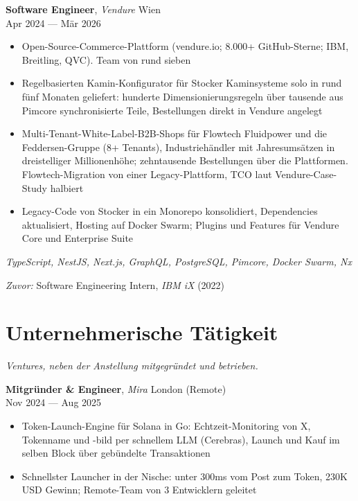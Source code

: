 \documentclass[a4paper,10pt]{article}
\newcommand{\entry}[4]{%
  \textbf{#1}, \textit{#2} \hfill #3 \\ \vspace{-2pt}
  {\small #4}%
}
\begin{document}
\vspace{3pt}
\entry{Software Engineer}{Vendure}{Wien}{Apr 2024 --- M\"ar 2026}
\begin{itemize}
  \item Open-Source-Commerce-Plattform (vendure.io; 8.000+ GitHub-Sterne; IBM, Breitling, QVC). Team von rund sieben
  \item Regelbasierten Kamin-Konfigurator f\"ur Stocker Kaminsysteme solo in rund f\"unf Monaten geliefert: hunderte Dimensionierungsregeln \"uber tausende aus Pimcore synchronisierte Teile, Bestellungen direkt in Vendure angelegt
  \item Multi-Tenant-White-Label-B2B-Shops f\"ur Flowtech Fluidpower und die Feddersen-Gruppe (8+ Tenants), Industrieh\"andler mit Jahresums\"atzen in dreistelliger Millionenh\"ohe; zehntausende Bestellungen \"uber die Plattformen. Flowtech-Migration von einer Legacy-Plattform, TCO laut Vendure-Case-Study halbiert
  \item Legacy-Code von Stocker in ein Monorepo konsolidiert, Dependencies aktualisiert, Hosting auf Docker Swarm; Plugins und Features f\"ur Vendure Core und Enterprise Suite
\end{itemize}
{\small\textit{TypeScript, NestJS, Next.js, GraphQL, PostgreSQL, Pimcore, Docker Swarm, Nx}}

\vspace{3pt}
{\small\textit{Zuvor:} Software Engineering Intern, \textit{IBM iX} (2022)}

\section{Unternehmerische T\"atigkeit}
\vspace{-1pt}
{\small\textit{Ventures, neben der Anstellung mitgegr\"undet und betrieben.}}
\vspace{3pt}

\entry{Mitgr\"under \& Engineer}{Mira}{London (Remote)}{Nov 2024 --- Aug 2025}
\begin{itemize}
  \item Token-Launch-Engine f\"ur Solana in Go: Echtzeit-Monitoring von X, Tokenname und -bild per schnellem LLM (Cerebras), Launch und Kauf im selben Block \"uber geb\"undelte Transaktionen
  \item Schnellster Launcher in der Nische: unter 300ms vom Post zum Token, 230K USD Gewinn; Remote-Team von 3 Entwicklern geleitet
\end{itemize}
\end{document}
